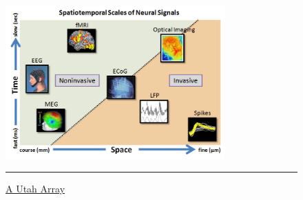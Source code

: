 \documentclass[preprint,12pt]{elsarticle}
\begin{document}
\begin{figure}[htbp]
\centering
\includegraphics[width=0.75\textwidth]{images/bmitypes.jpg}
\rule{35em}{0.5pt}
\caption[A Utah Array]{\href{http://lifesciences.ieee.org/publications/newsletter/april-2012/96-building-brain-machine-interfaces-neuroprosthetic-control-with-electrocorticographic-signals}{A Utah Array}}
\label{fig:bmitypes}
\end{figure}
\end{document}
